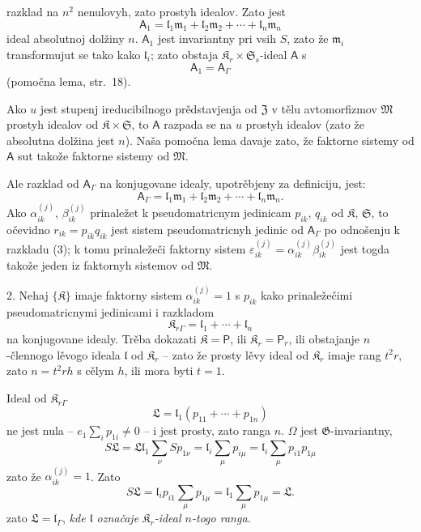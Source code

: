 \documentclass[11pt]{article}
\begin{document}
razklad na \(n^2\) nenulovyh, zato prostyh idealov. Zato jest
\[
\mathsf{A}_1=\mathfrak l_1\mathfrak m_1+\mathfrak l_2\mathfrak m_2+\cdots+\mathfrak l_n\mathfrak m_n
\]
ideal absolutnoj dolžiny \(n\). \(\mathsf{A}_1\) jest invariantny pri vsih \(S\), zato že \(\mathfrak m_i\) transformujut se tako kako \(\mathfrak l_i\); zato obstaja \(\mathfrak K_r\times\mathfrak S_s\)-ideal \(\mathsf{A}\) s
\[
\mathsf{A}_1=\mathsf{A}_\Gamma
\]
(pomočna lema, str.~18).

Ako \(u\) jest stupenj ireducibilnogo prědstavjenja od \(\mathfrak Z\) v tělu avtomorfizmov \(\mathfrak M\) prostyh idealov od \(\mathfrak K\times\mathfrak S\), to \(\mathsf{A}\) razpada se na \(u\) prostyh idealov (zato že absolutna dolžina jest \(n\)). Naša pomočna lema davaje zato, že faktorne sistemy od \(\mathsf{A}\) sut takože faktorne sistemy od \(\mathfrak M\).

Ale razklad od \(\mathsf{A}_\Gamma\) na konjugovane idealy, upotrěbjeny za definiciju, jest:
\[
\tag{3}
\mathsf{A}_\Gamma=\mathfrak l_1\mathfrak m_1+\mathfrak l_2\mathfrak m_2+\cdots+\mathfrak l_n\mathfrak m_n.
\]
Ako \(\alpha_{ik}^{(j)}\), \(\beta_{ik}^{(j)}\) prinaležet k pseudomatricnym jedinicam \(p_{ik}\), \(q_{ik}\) od \(\mathfrak K\), \(\mathfrak S\), to očevidno \(r_{ik}=p_{ik}q_{ik}\) jest sistem pseudomatricnyh jedinic od \(\mathsf{A}_\Gamma\) po odnošenju k razkladu (3); k tomu prinaležeči faktorny sistem \(\varepsilon_{ik}^{(j)}=\alpha_{ik}^{(j)}\beta_{ik}^{(j)}\) jest togda takože jeden iz faktornyh sistemov od \(\mathfrak M\).

2. Nehaj \(\{\mathfrak K\}\) imaje faktorny sistem \(\alpha_{ik}^{(j)}=1\) s \(p_{ik}\) kako prinaležečimi pseudomatricnymi jedinicami i razkladom
\[
\mathfrak K_{r\Gamma}=\mathfrak l_1+\cdots+\mathfrak l_n
\]
na konjugovane idealy. Trěba dokazati \(\mathfrak K=\mathsf P\), ili \(\mathfrak K_r=\mathsf P_r\), ili obstajanje \(n\)-člennogo lěvogo ideala \(\mathfrak l\) od \(\mathfrak K_r\) -- zato že prosty lěvy ideal od \(\mathfrak K_r\) imaje rang \(t^2r\), zato \(n=t^2rh\) s cělym \(h\), ili mora byti \(t=1\).

Ideal od \(\mathfrak K_{r\Gamma}\)
\[
\mathfrak L=\mathfrak l_1(p_{11}+\cdots+p_{1n})
\]
ne jest nula -- \(e_1\sum_i p_{1i}\ne0\) -- i jest prosty, zato ranga \(n\). \(\Omega\) jest \(\mathfrak G\)-invariantny,
\[
S\mathfrak L
=\mathfrak L\mathfrak l_1\sum_\nu S p_{1\nu}
=\mathfrak l_i\sum_\mu p_{i\mu}
=\mathfrak l_i\sum_\mu p_{i1}p_{1\mu}
\]
zato že \(\alpha_{ik}^{(j)}=1\). Zato
\[
S\mathfrak L=\mathfrak l_ip_{i1}\sum_\mu p_{1\mu}
=\mathfrak l_1\sum_\mu p_{1\mu}
=\mathfrak L.
\]
zato \(\mathfrak L=\mathfrak l_\Gamma\), \emph{kde \(\mathfrak l\) označaje \(\mathfrak K_r\)-ideal \(n\)-togo ranga.}
\end{document}
